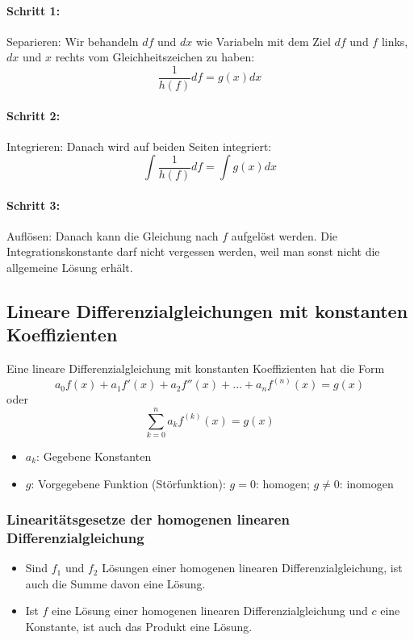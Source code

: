 \paragraph{Schritt 1:} Separieren: Wir behandeln $df$ und $dx$ wie Variabeln mit dem Ziel $df$ und $f$
links, $dx$ und $x$ rechts vom Gleichheitszeichen zu haben:
\[ \frac{1}{h(f)} df = g(x) dx \]

\paragraph{Schritt 2:} Integrieren: Danach wird auf beiden Seiten integriert:
\[ \int \frac{1}{h(f)} df = \int g(x) dx \]

\paragraph{Schritt 3:} Auflösen: Danach kann die Gleichung nach $f$
aufgelöst werden. Die Integrationskonstante darf nicht vergessen werden,
weil man sonst nicht die allgemeine Lösung erhält.

\subsection{Lineare Differenzialgleichungen mit konstanten Koeffizienten}
Eine lineare Differenzialgleichung mit konstanten Koeffizienten hat die Form
\[ a_{0}f(x) + a_{1}f'(x) + a_{2}f''(x) + \dots + a_{n}f^{(n)}(x) = g(x) \]
oder
\[ \sum_{k=0}^{n} a_{k}f^{(k)}(x) = g(x) \]
\begin{itemize}
  \item $a_k$: Gegebene Konstanten
  \item $g$: Vorgegebene Funktion (Störfunktion): $g = 0$: homogen; $g \ne 0$: inomogen
\end{itemize}

\subsubsection{Linearitätsgesetze der homogenen linearen Differenzialgleichung}
\begin{itemize}
  \item Sind $f_1$ und $f_2$ Lösungen einer homogenen linearen
    Differenzialgleichung, ist auch die Summe davon eine Lösung.
  \item Ist $f$ eine Lösung einer homogenen linearen
    Differenzialgleichung und $c$ eine Konstante, ist auch das Produkt
    eine Lösung.
\end{itemize}

